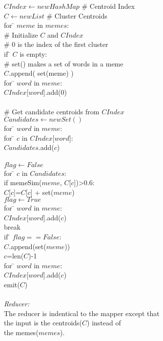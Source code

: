 \documentclass{sig-alternate}
\begin{document}
\begin{itemize}
\begin{centering}
\begin{tabbing}
$CIndex \leftarrow new HashMap$ \# Centroid Index\\
$C \leftarrow new List$ \# Cluster Centroids\\
for \= $meme$ in $memes$:\\
\>	\# Initialize $C$ and $CIndex$\\
\>	\# 0 is the index of the first cluster\\
\>	if \= $C$ is empty:\\
\>\>	\# set() makes a set of words in a meme\\
\>\>	$C$.append( set(meme) )\\
\>\>	for \= $word$ in $meme$:\\
\>\>\>		$CIndex$[$word$].add(0) \\
\\
\>	\# Get candidate centroids from $CIndex$\\
\>	$Candidates \leftarrow new Set()$\\
\>	for \= $word$ in $meme$:\\
\>\>		for \= $c$ in $CIndex$[$word$]:\\
\>\>\>		$Candidates$.add($c$)\\
\\
\>	$flag \leftarrow False$\\
\>	for \= $c$ in $Candidates$:\\
\>\>	if memeSim($meme$, $C$[$c$])>0.6:\\
\>\>\>		$C$[$c$]=$C$[$c$] + set($meme$)\\
\>\>\>	$flag \leftarrow True$\\
\>\>\>		for \= $word$ in $meme$:\\
\>\>\>\>		$CIndex$[$word$].add($c$) \\
\>\>\>		break
\\
\> if \= $flag == False$:\\
\>\>	$C$.append(set($meme$))\\
\>\>	$c$=len($C$)-1\\
\>\>		for \= $word$ in $meme$:\\
\>\>\>		$CIndex$[$word$].add($c$) \\
emit($C$)\\

\\
\emph{Reducer:}\\
\>The reducer is indentical to the mapper except that \\
\> the input is the centroids($C$) instead of\\
\> the memes($memes$).\\

\end{tabbing}

\end{centering}

 
\end{itemize}
\end{document}
